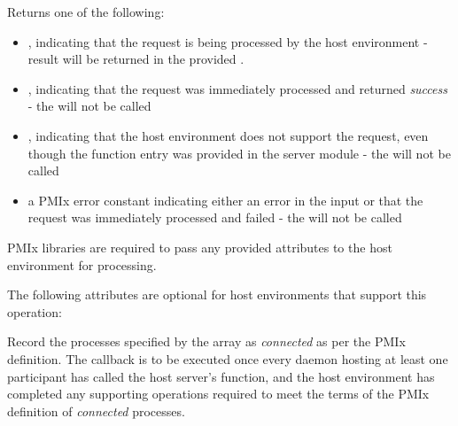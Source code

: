 \begin{arglist}
\end{arglist}

Returns one of the following:

\begin{itemize}
    \item {}, indicating that the request is being processed by the host environment - result will be returned in the provided .
    \item {}, indicating that the request was immediately processed and returned \textit{success} - the  will not be called
    \item {}, indicating that the host environment does not support the request, even though the function entry was provided in the server module - the  will not be called
    \item a PMIx error constant indicating either an error in the input or that the request was immediately processed and failed - the  will not be called
\end{itemize}

\reqattrstart
{}

\ac{PMIx} libraries are required to pass any provided attributes to the host environment for processing.
\reqattrend

\optattrstart
The following attributes are optional for host environments that support this operation:


\optattrend

\descr

Record the processes specified by the  array as \textit{connected} as per the \ac{PMIx} definition. The callback is to be executed once every daemon hosting at least one participant has called the host server's  function, and the host environment has completed any supporting operations required to meet the terms of the \ac{PMIx} definition of \textit{connected} processes.

